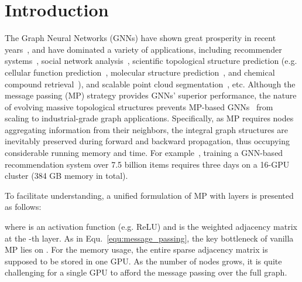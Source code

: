 \message{ !name(main.tex)}\documentclass{article}
\begin{document}
\section{Introduction}
\vspace{-2mm}
The Graph Neural Networks (GNNs) have shown great prosperity in recent years~\citep{kipf2016semi,velickovic2017graph,hamilton2017inductive,xu2018powerful}, and have dominated a variety of applications, including recommender systems~\citep{he2020lightgcn,ying2018graph,zheng2021cold}, social network analysis~\citep{tang2009relational,gao2018large,huang2019graph}, scientific topological structure prediction (e.g. cellular function prediction~\citep{hu2020open,zitnik2017predicting}, molecular structure prediction~\citep{hu2019strategies,you2020graph}, and chemical compound retrieval~\citep{wale2008comparison}), and scalable point cloud segmentation~\citep{li2019deepgcns,wang2019dynamic}, etc. Although the message passing (MP) strategy provides GNNs' superior performance, the nature of evolving massive topological structures prevents MP-based GNNs~\citep{li2020deepergcn,klicpera2018predict,xu2018representation,kipf2016semi,velickovic2017graph,xu2018powerful,gao2019graph, zhou2019multi} from scaling to industrial-grade graph applications. Specifically, as MP requires nodes aggregating information from their neighbors, the integral graph structures are inevitably preserved during forward and backward propagation, thus occupying considerable running memory and time. For example~\citep{ying2018graph}, training a GNN-based recommendation system over 7.5 billion items requires three days on a 16-GPU cluster (384 GB memory in total).

To facilitate understanding, a unified formulation of MP with  layers is presented as follows:

where  is an activation function (e.g. ReLU) and  is the weighted adjacency matrix at the -th layer. As in Equ.~\eqref{equ:message_passing}, the key bottleneck of vanilla MP lies on . For the memory usage, the entire sparse adjacency matrix is supposed to be stored in one GPU. As the number of nodes grows, it is quite challenging for a single GPU to afford the message passing over the full graph.
\end{document}
